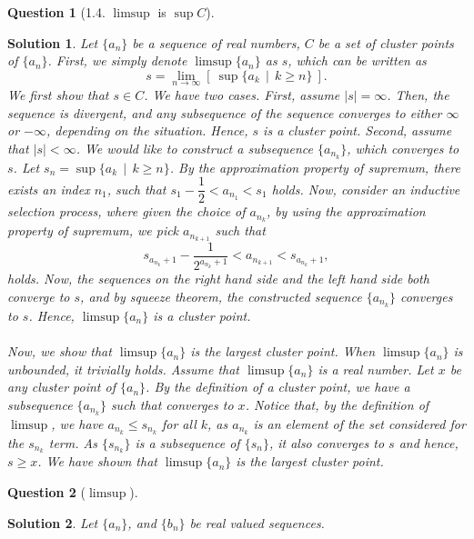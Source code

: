 \documentclass{article} %
\theoremstyle{quest}
\newtheorem*{question}{Question}
\newtheorem*{solution}{Solution}
\begin{document}
\bigskip

\begin{question}[1.4. $\limsup$ is $\sup C$]
\end{question}
\begin{solution}
Let $\{ a_n \}$ be a sequence of
real numbers, $C$ be a set of cluster points of $\{ a_n \}$. 
First, 
we simply denote $\limsup \{ a_n \}$ as $s$, which can be written as
\[
s = 
\underset{n \to \infty}{\lim} [ \> \sup \{ a_k \>\> | \>\> k \geq n \} \> ].
\]
We first show that $s \in C$. We have two cases. First, assume $|s| = \infty$. Then, the sequence 
is divergent, and any subsequence of the sequence converges to either $\infty$ or $-\infty$, 
depending on the situation. Hence, $s$ is a cluster point. Second, assume that $|s| < \infty$.
We would like to construct a subsequence $\{a_{n_k} \}$, which converges to $s$. 
Let $s_n = \sup \{ a_k \>\> | \>\> k \geq n \}$. By the approximation property of supremum, 
there exists an index $n_1$, such that $s_1 - \dfrac{1}{2} < a_{n_1} < s_1$ holds.
Now, consider an inductive selection process, where given the choice of $a_{n_k}$, by using
the approximation property of supremum, we pick
$a_{n_{k+1}}$ such that 
\[
s_{a_{n_k}+1} - \dfrac{1}{2^{a_{n_k}+1}} < a_{n_{k+1}} < s_{a_{n_k}+1},
\]
holds. Now, the sequences on the right hand side and the left hand side both converge to $s$,
and by squeeze theorem, the constructed sequence $\{ a_{n_k} \}$ converges to $s$. Hence,
$\limsup \{ a_n \}$ is a cluster point.
\\
\\
Now, we show that $\limsup \{ a_n \}$ is the
largest cluster point. When $\limsup \{ a_n \}$ is unbounded, it trivially holds. Assume that
$\limsup \{ a_n \}$ is a real number.
Let $x$ be any cluster point of $\{ a_n \}$. By the definition of a cluster point,
we have a subsequence $\{ a_{n_k} \} $ such that converges to $x$. Notice that, by the definition of 
$\limsup$, we have $ a_{n_k} \leq s_{n_k}$ for all $k$, as $a_{n_k}$ is an element of the set considered
for the $s_{n_k}$ term. As $\{ s_{n_k} \}$ is a subsequence of $\{s_n \}$, it also converges to $s$ and
hence, $s \geq x$. We have
shown that $\limsup \{ a_n \}$ is the largest cluster point.
\end{solution}

\bigskip

\begin{question}[$\limsup$]
\end{question}
\begin{solution}
Let $\{ a_n \}$, and $\{ b_n \}$ be real valued sequences.
\end{solution}
\end{document}
